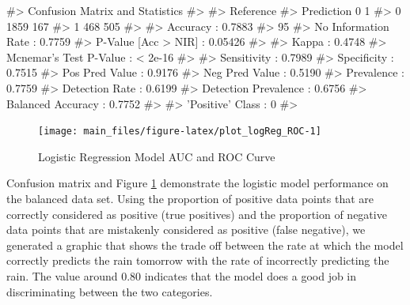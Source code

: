 \begin{Schunk}
\begin{Soutput}
#> Confusion Matrix and Statistics
#> 
#>           Reference
#> Prediction    0    1
#>          0 1859  167
#>          1  468  505
#>                                           
#>                Accuracy : 0.7883          
#>                  95%
#>     No Information Rate : 0.7759          
#>     P-Value [Acc > NIR] : 0.05426         
#>                                           
#>                   Kappa : 0.4748          
#>  Mcnemar's Test P-Value : < 2e-16         
#>                                           
#>             Sensitivity : 0.7989          
#>             Specificity : 0.7515          
#>          Pos Pred Value : 0.9176          
#>          Neg Pred Value : 0.5190          
#>              Prevalence : 0.7759          
#>          Detection Rate : 0.6199          
#>    Detection Prevalence : 0.6756          
#>       Balanced Accuracy : 0.7752          
#>                                           
#>        'Positive' Class : 0               
#> 
\end{Soutput}
\end{Schunk}

\begin{Schunk}
\begin{figure}[H]

{\centering \texttt{[image: main\_files/figure-latex/plot\_logReg\_ROC-1]} 

}

\caption[Logistic Regression Model AUC and ROC Curve]{Logistic Regression Model AUC and ROC Curve}\label{fig:plot_logReg_ROC}
\end{figure}
\end{Schunk}

Confusion matrix and Figure \ref{fig:plot_logReg_ROC} demonstrate the
logistic model performance on the balanced data set. Using the
proportion of positive data points that are correctly considered as
positive (true positives) and the proportion of negative data points
that are mistakenly considered as positive (false negative), we
generated a graphic that shows the trade off between the rate at which
the model correctly predicts the rain tomorrow with the rate of
incorrectly predicting the rain. The value around 0.80 indicates that
the model does a good job in discriminating between the two categories.

